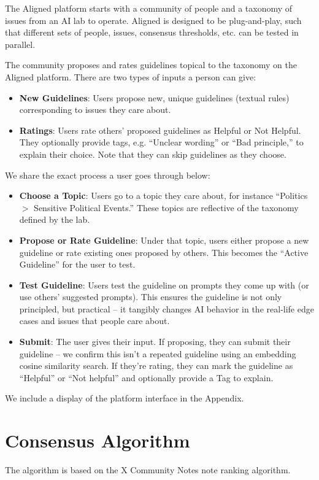\documentclass{article}
\begin{document}
\begin{multicols}{2}
The Aligned platform starts with a community of people and a taxonomy of issues from an AI lab to operate. Aligned is designed to be plug-and-play, such that different sets of people, issues, consensus thresholds, etc. can be tested in parallel.

The community proposes and rates guidelines topical to the taxonomy on the Aligned platform. There are two types of inputs a person can give:
\begin{itemize}[itemsep=0pt, topsep=0pt]
    \item \textbf{New Guidelines}: Users propose new, unique guidelines (textual rules) corresponding to issues they care about.
    \item \textbf{Ratings}: Users rate others’ proposed guidelines as Helpful or Not Helpful. They optionally provide tags, e.g. “Unclear wording” or “Bad principle,” to explain their choice. Note that they can skip guidelines as they choose.
\end{itemize}

We share the exact process a user goes through below:
\begin{itemize}[itemsep=0pt, topsep=0pt]
    \item \textbf{Choose a Topic}: Users go to a topic they care about, for instance “Politics $>$ Sensitive Political Events.” These topics are reflective of the taxonomy defined by the lab.
    \item \textbf{Propose or Rate Guideline}: Under that topic, users either propose a new guideline or rate existing ones proposed by others. This becomes the “Active Guideline” for the user to test.
    \item \textbf{Test Guideline}: Users test the guideline on prompts they come up with (or use others’ suggested prompts). This ensures the guideline is not only principled, but practical – it tangibly changes AI behavior in the real-life edge cases and issues that people care about.
    \item \textbf{Submit}: The user gives their input. If proposing, they can submit their guideline -- we confirm this isn't a repeated guideline using an embedding cosine similarity search. If they’re rating, they can mark the guideline as “Helpful” or “Not helpful” and optionally provide a Tag to explain.
\end{itemize}

We include a display of the platform interface in the Appendix.

\section{Consensus Algorithm} \label{consensus}
The algorithm is based on the X Community Notes note ranking algorithm. \cite{birdwatch2022, NoteRankingAlgorithm}


\end{multicols}
\end{document}
